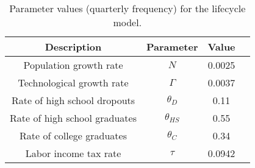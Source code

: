 \documentclass{article}
\begin{document}
\begin{sidewaystable}[ht]
    \centering
    \begin{tabular}{cccc}
        \toprule
        Description & Parameter & Value  \\
        \midrule
        Population growth rate & $N$ & 0.0025  \\
        Technological growth rate & $\Gamma$ & 0.0037  \\
        Rate of high school dropouts & $\theta_D $ & 0.11  \\
        Rate of high school graduates & $\theta_{HS} $ & 0.55  \\
        Rate of college graduates & $\theta_C $ & 0.34  \\
        Labor income tax rate & $\tau$ & 0.0942  \\
        \bottomrule
    \end{tabular}
    \caption{Parameter values (quarterly frequency) for the lifecycle model.}
    \label{tab:calib1}
\end{sidewaystable}
\end{document}
